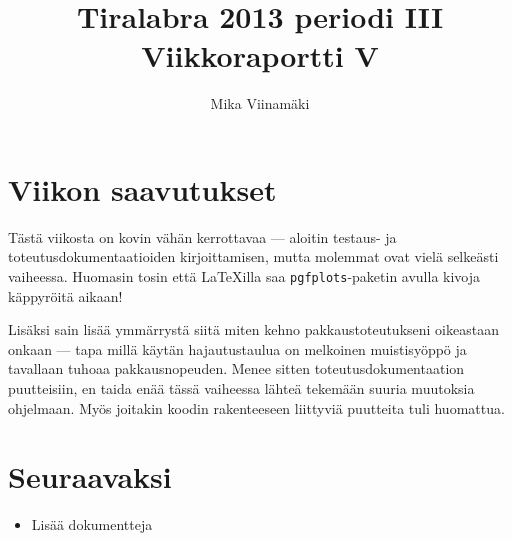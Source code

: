 \documentclass{article}
\begin{document}
\title{Tiralabra 2013 periodi III \\ Viikkoraportti V}
\author{Mika Viinamäki}
\maketitle

\section{Viikon saavutukset}

Tästä viikosta on kovin vähän kerrottavaa --- aloitin testaus- ja toteutusdokumentaatioiden kirjoittamisen, mutta molemmat ovat vielä selkeästi vaiheessa. Huomasin tosin että \LaTeX illa saa \texttt{pgfplots}-paketin avulla kivoja käppyröitä aikaan!

Lisäksi sain lisää ymmärrystä siitä miten kehno pakkaustoteutukseni oikeastaan onkaan --- tapa millä käytän hajautustaulua on melkoinen muistisyöppö ja tavallaan tuhoaa pakkausnopeuden. Menee sitten toteutusdokumentaation puutteisiin, en taida enää tässä vaiheessa lähteä tekemään suuria muutoksia ohjelmaan. Myös joitakin koodin rakenteeseen liittyviä puutteita tuli huomattua.

\section{Seuraavaksi}

\begin{itemize}
    \item Lisää dokumentteja
\end{itemize}
\end{document}
